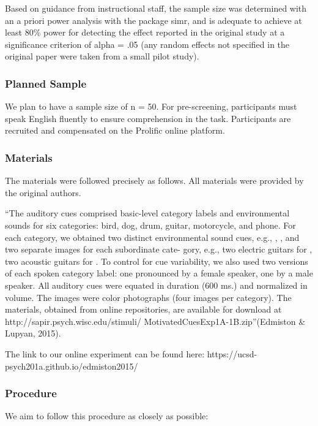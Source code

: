 \documentclass[
  letterpaper,
  DIV=11,
  numbers=noendperiod]{scrartcl}
\begin{document}
Based on guidance from instructional staff, the sample size was
determined with an a priori power analysis with the package simr, and is
adequate to achieve at least 80\% power for detecting the effect
reported in the original study at a significance criterion of alpha =
.05 (any random effects not specified in the original paper were taken
from a small pilot study).

\subsubsection{Planned Sample}\label{planned-sample}

We plan to have a sample size of n = 50. For pre-screening, participants
must speak English fluently to ensure comprehension in the task.
Participants are recruited and compensated on the Prolific online
platform.

\subsubsection{Materials}\label{materials}

The materials were followed precisely as follows. All materials were
provided by the original authors.

``The auditory cues comprised basic-level category labels and
environmental sounds for six categories: bird, dog, drum, guitar,
motorcycle, and phone. For each category, we obtained two distinct
environmental sound cues, e.g., , , and two separate images for each
subordinate cate- gory, e.g., two electric guitars for , two acoustic
guitars for . To control for cue variability, we also used two versions
of each spoken category label: one pronounced by a female speaker, one
by a male speaker. All auditory cues were equated in duration (600 ms.)
and normalized in volume. The images were color photographs (four images
per category). The materials, obtained from online repositories, are
available for download at http://sapir.psych.wisc.edu/stimuli/
MotivatedCuesExp1A-1B.zip''(Edmiston \& Lupyan, 2015).

The link to our online experiment can be found here:
https://ucsd-psych201a.github.io/edmiston2015/

\subsubsection{Procedure}\label{procedure}

We aim to follow this procedure as closely as possible:
\end{document}
